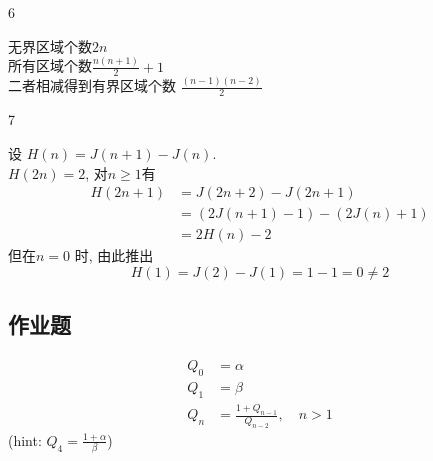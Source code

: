 \begin{exercise}6
\end{exercise}

\begin{answer}
	无界区域个数$ 2n $\\
	所有区域个数$ \frac{n(n+1)}{2}+1 $ \\
	二者相减得到有界区域个数 $ \frac{(n-1)(n-2)}{2} $
\end{answer}

\begin{exercise}7
\end{exercise}

\begin{answer}
	设 $ H(n) = J(n+1) - J(n) $.\\
	$ H(2n) = 2 $, 对$ n\geqslant 1 $有\\
	\begin{align*}
		 H(2n+1)
		 &= J(2n+2) - J(2n+1) \\
		 &= (2J(n+1)-1) - (2J(n)+1)\\
		 &= 2H(n) - 2
	\end{align*}
	但在$ n=0 $	时, 由此推出
	\begin{equation*}
		H(1) = J(2)-J(1) = 1 - 1 = 0 \neq 2
	\end{equation*}
\end{answer}

\subsection{作业题}
\begin{exercise}	
	\begin{align*}
		Q_0 &= \alpha\\
		Q_1 &= \beta \\
		Q_n &= \frac{1+Q_{n-1}}{Q_{n-2}} ,\quad n>1
	\end{align*}
	(hint: $ Q_4 = \frac{1+\alpha}{\beta} $)
\end{exercise}

